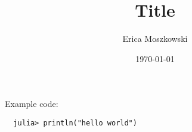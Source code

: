 \documentclass[12pt]{article}
\author{Erica Moszkowski}
\title{Title}
\date{\today}
\begin{document}
\maketitle

{
  \hypersetup{linkcolor=black}
  \tableofcontents %
}

Example code:
\lstset{style=julia}
\begin{lstlisting}
  julia> println("hello world")
\end{lstlisting}


\clearpage


\end{document}
